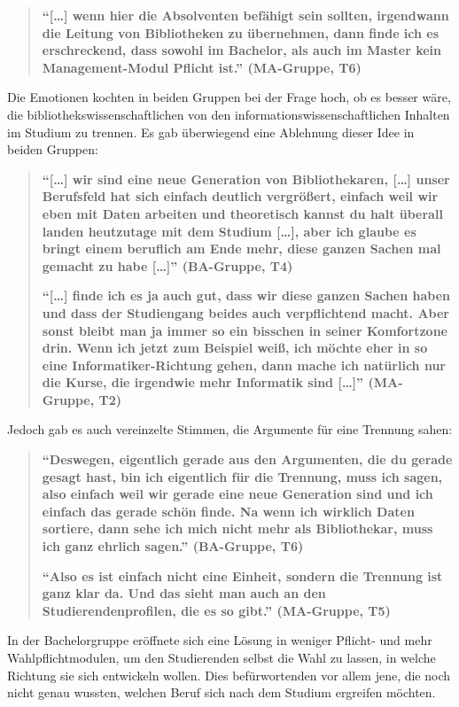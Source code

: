 \documentclass[a4paper,
fontsize=11pt,
oneside,
numbers=noperiodatend,
parskip=half-,
bibliography=totoc,
final
]{scrartcl}
\begin{document}
\begin{quote}
\textbf{\enquote{{[}\ldots{}{]} wenn hier die Absolventen befähigt sein
sollten, irgendwann die Leitung von Bibliotheken zu übernehmen, dann
finde ich es erschreckend, dass sowohl im Bachelor, als auch im Master
kein Management-Modul Pflicht ist.} (MA-Gruppe, T6)}
\end{quote}

Die Emotionen kochten in beiden Gruppen bei der Frage hoch, ob es besser
wäre, die bibliothekswissenschaftlichen von den
informationswissenschaftlichen Inhalten im Studium zu trennen. Es gab
überwiegend eine Ablehnung dieser Idee in beiden Gruppen:

\begin{quote}
\textbf{\enquote{{[}\ldots{}{]} wir sind eine neue Generation von
Bibliothekaren, {[}\ldots{}{]} unser Berufsfeld hat sich einfach
deutlich vergrößert, einfach weil wir eben mit Daten arbeiten und
theoretisch kannst du halt überall landen heutzutage mit dem Studium
{[}\ldots{}{]}, aber ich glaube es bringt einem beruflich am Ende mehr,
diese ganzen Sachen mal gemacht zu habe {[}\ldots{}{]}} (BA-Gruppe, T4)}

\textbf{\enquote{{[}\ldots{}{]} finde ich es ja auch gut, dass wir diese
ganzen Sachen haben und dass der Studiengang beides auch verpflichtend
macht. Aber sonst bleibt man ja immer so ein bisschen in seiner
Komfortzone drin. Wenn ich jetzt zum Beispiel weiß, ich möchte eher in
so eine Informatiker-Richtung gehen, dann mache ich natürlich nur die
Kurse, die irgendwie mehr Informatik sind {[}\ldots{}{]}} (MA-Gruppe,
T2)}
\end{quote}

Jedoch gab es auch vereinzelte Stimmen, die Argumente für eine Trennung
sahen:

\begin{quote}
\textbf{\enquote{Deswegen, eigentlich gerade aus den Argumenten, die du
gerade gesagt hast, bin ich eigentlich für die Trennung, muss ich sagen,
also einfach weil wir gerade eine neue Generation sind und ich einfach
das gerade schön finde. Na wenn ich wirklich Daten sortiere, dann sehe
ich mich nicht mehr als Bibliothekar, muss ich ganz ehrlich sagen.}
(BA-Gruppe, T6)}

\textbf{\enquote{Also es ist einfach nicht eine Einheit, sondern die
Trennung ist ganz klar da. Und das sieht man auch an den
Studierendenprofilen, die es so gibt.} (MA-Gruppe, T5)}
\end{quote}

In der Bachelorgruppe eröffnete sich eine Lösung in weniger Pflicht- und
mehr Wahlpflichtmodulen, um den Studierenden selbst die Wahl zu lassen,
in welche Richtung sie sich entwickeln wollen. Dies befürwortenden vor
allem jene, die noch nicht genau wussten, welchen Beruf sich nach dem
Studium ergreifen möchten.
\end{document}
